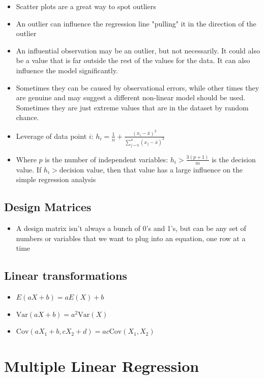 \documentclass{article}
\begin{document}
\begin{itemize}
    \item Scatter plots are a great way to spot outliers
    \item An outlier can influence the regression line "pulling" it in the direction of the outlier
    \item An influential observation may be an outlier, but not necessarily. It could also be a value that is far outside the rest of the values for the data. It can also influence the model significantly.
    \item Sometimes they can be caused by observational errors, while other times they are genuine and may suggest a different non-linear model should be used. Sometimes they are just extreme values that are in the dataset by random chance.
    \item Leverage of data point $i$: $h_i=\frac{1}{n} + \frac{(x_i-\bar{x})^2}{\sum_{j=0}^n(x_j-\bar{x})^2}$
    \item Where $p$ is the number of independent variables: $h_i>\frac{3(p+1)}{m}$ is the decision value. If $h_i>\text{decision value}$, then that value has a large influence on the simple regression analysis
\end{itemize}

\subsection{Design Matrices}

\begin{itemize}
    \item A design matrix isn't always a bunch of 0's and 1's, but can be any set of numbers or variables that we want to plug into an equation, one row at a time
\end{itemize}

\subsection{Linear transformations}

\begin{itemize}
    \item $E(aX+b)=aE(X)+b$
    \item $\text{Var}(aX+b)=a^2 \text{Var}(X)$
    \item $\text{Cov}(aX_1+b,cX_2+d)=ac \text{Cov}(X_1,X_2)$
\end{itemize}

\section{Multiple Linear Regression}
\end{document}
